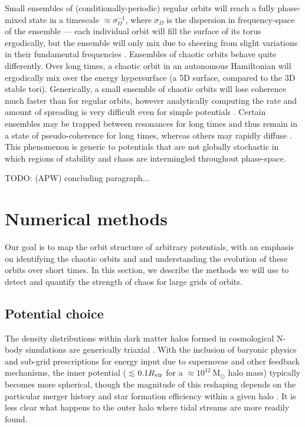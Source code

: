 \documentclass[letterpaper,12pt,preprint]{aastex}
\newcommand{\msun}{\ensuremath{\mathrm{M}_\odot}}
\newcommand{\todo}[2]{{\color{red} TODO: (\MakeUppercase{#1}) #2}}
\begin{document}
Small ensembles of (conditionally-periodic) regular orbits will reach a fully phase-mixed state in a timescale  $\approx\sigma_\Omega^{-1}$, where $\sigma_\Omega$ is the dispersion in frequency-space of the ensemble --- each individual orbit will fill the surface of its torus ergodically, but the ensemble will only mix due to sheering from slight variations in their fundamental frequencies \citep{merritt96, helmi99}. Ensembles of chaotic orbits behave quite differently. Over long times, a chaotic orbit in an autonomous Hamiltonian will ergodically mix over the energy hypersurface (a 5D surface, compared to the 3D stable tori). Generically, a small ensemble of chaotic orbits will lose coherence much faster than for regular orbits, however analytically computing the rate and amount of spreading is very difficult even for simple potentials \cite[see, e.g.,][]{chirikov??}. Certain ensembles may be trapped between resonances for long times and thus remain in a state of pseudo-coherence for long times, whereas others may rapidly diffuse \citep[see, e.g.,][]{merritt96}. This phenomenon is generic to potentials that are not globally stochastic in which regions of stability and chaos are intermingled throughout phase-space. 

\todo{apw}{concluding paragraph...}

\section{Numerical methods}\label{sec:methods}

Our goal is to map the orbit structure of arbitrary potentials, with an emphasis on identifying the chaotic orbits and and understanding the evolution of these orbits over short times. In this section, we describe the methods we will use to detect and quantify the strength of chaos for large grids of orbits.

\subsection{Potential choice}\label{sec:potential}

The density distributions within dark matter halos formed in cosmological N-body simulations are generically triaxial \citep[e.g.,][]{jing02, bett07, zemp09, veraciro11}. With the inclusion of baryonic physics and sub-grid prescriptions for energy input due to supernovae and other feedback mechanisms, the inner potential ($\lesssim$$0.1R_{\rm vir}$ for a $\approx$$10^{12}~\msun$ halo mass) typically becomes more spherical, though the magnitude of this reshaping depends on the particular merger history and star formation efficiency within a given halo \citep[e.g.,][]{dubinski??, butsky15}. It is less clear what happens to the outer halo where tidal streams are more readily found. %
\end{document}
